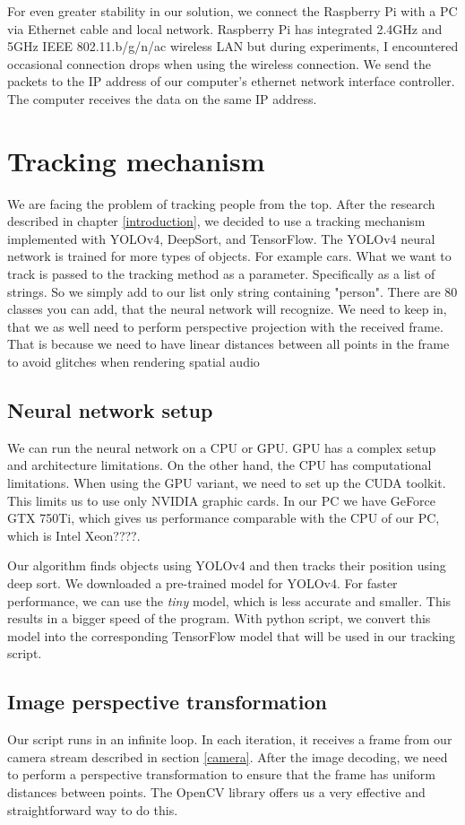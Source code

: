 \documentclass{ctuthesis}
\begin{document}
For even greater stability in our solution, we connect the Raspberry Pi with a PC via Ethernet cable and local network. Raspberry Pi has integrated 2.4GHz and 5GHz IEEE 802.11.b/g/n/ac wireless LAN \cite{1} but during experiments, I encountered occasional connection drops when using the wireless connection. We send the packets to the IP address of our computer's ethernet network interface controller. The computer receives the data on the same IP address.

\section{Tracking mechanism}
We are facing the problem of tracking people from the top. After the research described in chapter  \ref{introduction}, we decided to use a tracking mechanism implemented with YOLOv4, DeepSort, and TensorFlow. The YOLOv4 neural network is trained for more types of objects. For example cars. What we want to track is passed to the tracking method as a parameter. Specifically as a list of strings. So we simply add to our list only string containing "person". There are 80 classes you can add, that the neural network will recognize. We need to keep in, that we as well need to perform perspective projection with the received frame. That is because we need to have linear distances between all points in the frame to avoid glitches when rendering spatial audio

\subsection{Neural network setup}
We can run the neural network on a CPU or GPU. GPU has a complex setup and architecture limitations. On the other hand, the CPU has computational limitations. When using the GPU variant, we need to set up the CUDA toolkit. This limits us to use only NVIDIA graphic cards. In our PC we have GeForce GTX 750Ti, which gives us performance comparable with the CPU of our PC, which is Intel Xeon????. 

Our algorithm finds objects using YOLOv4 and then tracks their position using deep sort. We downloaded a pre-trained model for YOLOv4\cite{96}. For faster performance, we can use the \textit{tiny} model, which is less accurate and smaller. This results in a bigger speed of the program. With python script, we convert this model into the corresponding TensorFlow model that will be used in our tracking script.

\subsection{Image perspective transformation}
Our script runs in an infinite loop. In each iteration, it receives a frame from our camera stream described in section \ref{camera}. After the image decoding, we need to perform a perspective transformation to ensure that the frame has uniform distances between points. The OpenCV library offers us a very effective and straightforward way to do this. 
\end{document}
